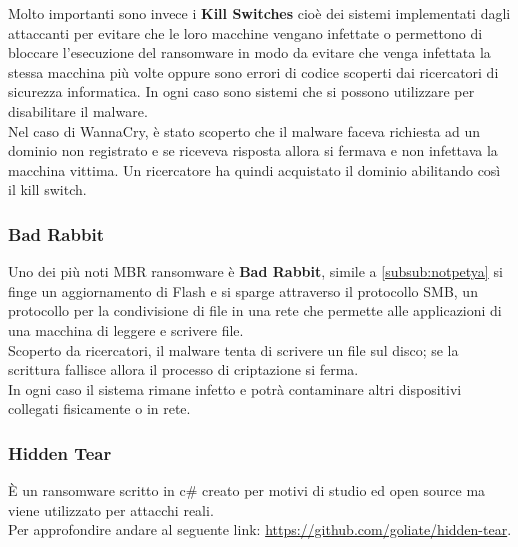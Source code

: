 Molto importanti sono invece i \textbf{Kill Switches} cioè dei sistemi implementati dagli attaccanti per evitare che le loro macchine vengano infettate o permettono di bloccare l'esecuzione del ransomware in modo da evitare che venga infettata la stessa macchina più volte oppure sono errori di codice scoperti dai ricercatori di sicurezza informatica.
In ogni caso sono sistemi che si possono utilizzare per disabilitare il malware.\\
Nel caso di WannaCry, è stato scoperto che il malware faceva richiesta ad un dominio non registrato e se riceveva risposta allora si fermava e non infettava la macchina vittima.
Un ricercatore ha quindi acquistato il dominio abilitando così il kill switch.

\subsubsection{Bad Rabbit}
Uno dei più noti \acrshort{MBR} ransomware è \textbf{Bad Rabbit}, simile a \ref{subsub:notpetya} si finge un aggiornamento di Flash e si sparge attraverso il protocollo \acrfull{SMB}, un protocollo per la condivisione di file in una rete che permette alle applicazioni di una macchina di leggere e scrivere file.\\
Scoperto da ricercatori, il malware tenta di scrivere un file sul disco; se la scrittura fallisce allora il processo di criptazione si ferma.\\
In ogni caso il sistema rimane infetto e potrà contaminare altri dispositivi collegati fisicamente o in rete.

\subsubsection{Hidden Tear}
È un ransomware scritto in c\# creato per motivi di studio ed open source ma viene utilizzato per attacchi reali.\\
Per approfondire andare al seguente link: \url{https://github.com/goliate/hidden-tear}.

